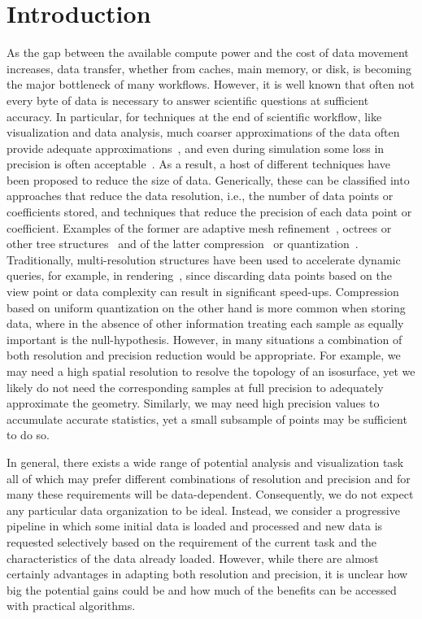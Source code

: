 \section{Introduction}

As the gap between the available compute power and the cost of data
movement increases, data transfer, whether from caches, main memory,
or disk, is becoming the major bottleneck of many workflows. However,
it is well known that often not every byte of data is necessary to
answer scientific questions at sufficient accuracy.  In particular,
for techniques at the end of scientific workflow, like visualization
and data analysis, much coarser approximations of the data often
provide adequate
approximations~\cite{woodring2011,covra2012,compression_sim2013}, and
even during simulation some loss in precision is often
acceptable~\cite{compression_sim2013}. As a result, a host of
different techniques have been proposed to reduce the size of
data. Generically, these can be classified into approaches that reduce
the data resolution, i.e., the number of data points or coefficients
stored, and techniques that reduce the precision of each data point or
coefficient.  Examples of the former are adaptive mesh
refinement~\cite{amr1989}, octrees or other tree
structures~\cite{hierarchical1984} and of the latter
compression~\cite{zfp2014} or quantization~\cite{vq1992}.
Traditionally, multi-resolution structures have been used to
accelerate dynamic queries, for example, in
rendering~\cite{multires_octree1999}, since discarding data points
based on the view point or data complexity can result in significant
speed-ups. Compression based on uniform quantization on the other hand
is more common when storing data, where in the absence of other
information treating each sample as equally important is the
null-hypothesis. However, in many situations a combination of both
resolution and precision reduction would be appropriate.  For example,
we may need a high spatial resolution to resolve
the topology of an isosurface, yet we likely do not need the
corresponding samples at full precision to adequately approximate the geometry.
Similarly, we may need high precision values to accumulate accurate
statistics, yet a small subsample of points may be sufficient to do
so.    

In general, there exists a wide range of potential analysis and
visualization task all of which may prefer different combinations of
resolution and precision and for many these requirements will be
data-dependent.  Consequently, we do not expect any particular data
organization to be ideal. Instead, we consider a progressive pipeline
in which some initial data is loaded and processed and new data is
requested selectively based on the requirement of the current task and
the characteristics of the data already loaded. However, while there
are almost certainly advantages in adapting both resolution and
precision, it is unclear how big the potential gains could be and how
much of the benefits can be accessed with practical algorithms.


